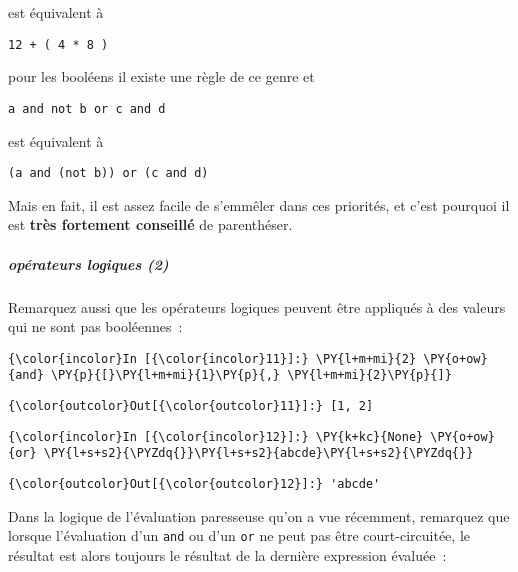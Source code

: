 est équivalent à

\begin{verbatim}
12 + ( 4 * 8 )
\end{verbatim}

pour les booléens il existe une règle de ce genre et

\begin{verbatim}
a and not b or c and d
\end{verbatim}

est équivalent à

\begin{verbatim}
(a and (not b)) or (c and d)
\end{verbatim}

Mais en fait, il est assez facile de s'emmêler dans ces priorités, et
c'est pourquoi il est \textbf{très fortement conseillé} de parenthéser.

    \hypertarget{opuxe9rateurs-logiques-2}{%
\subparagraph{opérateurs logiques (2)}\label{opuxe9rateurs-logiques-2}}

    Remarquez aussi que les opérateurs logiques peuvent être appliqués à des
valeurs qui ne sont pas booléennes~:

    \begin{Verbatim}[commandchars=\\\{\}]
{\color{incolor}In [{\color{incolor}11}]:} \PY{l+m+mi}{2} \PY{o+ow}{and} \PY{p}{[}\PY{l+m+mi}{1}\PY{p}{,} \PY{l+m+mi}{2}\PY{p}{]}
\end{Verbatim}


\begin{Verbatim}[commandchars=\\\{\}]
{\color{outcolor}Out[{\color{outcolor}11}]:} [1, 2]
\end{Verbatim}
            
    \begin{Verbatim}[commandchars=\\\{\}]
{\color{incolor}In [{\color{incolor}12}]:} \PY{k+kc}{None} \PY{o+ow}{or} \PY{l+s+s2}{\PYZdq{}}\PY{l+s+s2}{abcde}\PY{l+s+s2}{\PYZdq{}}
\end{Verbatim}


\begin{Verbatim}[commandchars=\\\{\}]
{\color{outcolor}Out[{\color{outcolor}12}]:} 'abcde'
\end{Verbatim}
            
    Dans la logique de l'évaluation paresseuse qu'on a vue récemment,
remarquez que lorsque l'évaluation d'un \texttt{and} ou d'un \texttt{or}
ne peut pas être court-circuitée, le résultat est alors toujours le
résultat de la dernière expression évaluée~:

